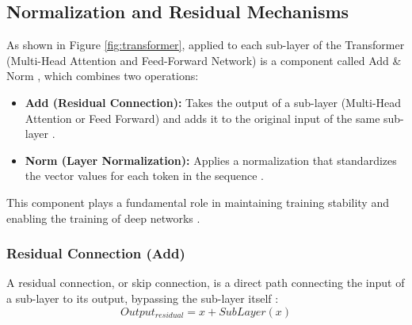 \subsection{Normalization and Residual Mechanisms}
As shown in Figure \ref{fig:transformer}, applied to each sub-layer of the Transformer (Multi-Head Attention and Feed-Forward Network) is a component called Add \& Norm \cite{arxiv-attention}, which combines two operations:
\begin{itemize}
\item \textbf{Add (Residual Connection):} Takes the output of a sub-layer (Multi-Head Attention or Feed Forward) and adds it to the original input of the same sub-layer \cite{arxiv-attention, arxiv-skipconnection-survey}.
\item \textbf{Norm (Layer Normalization):} Applies a normalization that standardizes the vector values for each token in the sequence \cite{arxiv-attention, stanford}.
\end{itemize}
This component plays a fundamental role in maintaining training stability and enabling the training of deep networks \cite{arxiv-attention, arxiv-skipconnection-survey}.

\subsubsection{Residual Connection (Add)}
A residual connection, or skip connection, is a direct path connecting the input of a sub-layer to its output, bypassing the sub-layer itself \cite{arxiv-attention, arxiv-skipconnection-survey}:
\begin{equation}
Output_{residual} = x + SubLayer(x)
\end{equation}

